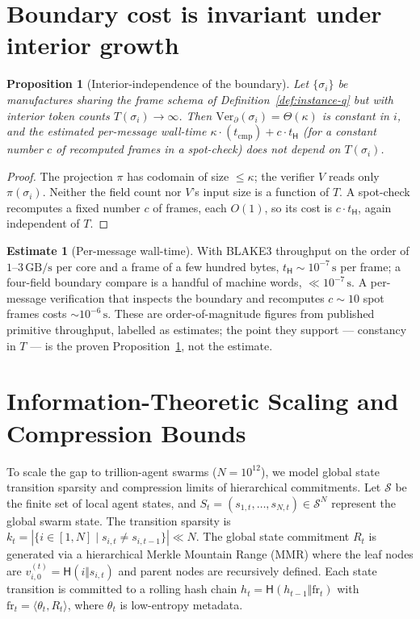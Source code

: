 \documentclass[11pt,oneside]{book}
\theoremstyle{definition}
\newtheorem{estimate}{Estimate}[chapter]
\theoremstyle{plain}
\newtheorem{proposition}[theorem]{Proposition}
\theoremstyle{remark}
\newcommand{\Proj}{\pi}                        %
\newcommand{\chainH}{\mathsf{H}}               %
\newcommand{\CL}{\kappa}                       %
\begin{document}
\section{Boundary cost is invariant under interior growth}

\begin{proposition}[Interior-independence of the boundary]\label{prop:invariance}
Let $\{\sigma_i\}$ be manufactures sharing the frame schema of Definition~\ref{def:instance-q} but with interior token counts $T(\sigma_i)\to\infty$. %
Then $\mathrm{Ver}_\partial(\sigma_i)=\Theta(\CL)$ is constant in $i$, and the estimated per-message wall-time $\CL\cdot(t_{\text{cmp}}) + c\cdot t_{\chainH}$ (for a constant number $c$ of recomputed frames in a spot-check) does not depend on $T(\sigma_i)$. %
\end{proposition}

\begin{proof}
The projection $\Proj$ has codomain of size $\le\CL$; the verifier $V$ reads only $\Proj(\sigma_i)$. %
Neither the field count nor $V$'s input size is a function of $T$. %
A spot-check recomputes a fixed number $c$ of frames, each $O(1)$, so its cost is $c\cdot t_{\chainH}$, again independent of $T$. %
\end{proof}

\begin{estimate}[Per-message wall-time]\label{est:wall}
With BLAKE3 throughput on the order of $1$--$3\,\mathrm{GB/s}$ per core and a frame of a few hundred bytes, $t_{\chainH}\sim 10^{-7}\,\mathrm{s}$ per frame; a four-field boundary compare is a handful of machine words, $\ll 10^{-7}\,\mathrm{s}$. %
A per-message verification that inspects the boundary and recomputes $c\!\sim\!10$ spot frames costs $\sim 10^{-6}\,\mathrm{s}$. %
These are order-of-magnitude figures from published primitive throughput, labelled as estimates; the point they support --- constancy in $T$ --- is the proven Proposition~\ref{prop:invariance}, not the estimate. %
\end{estimate}

\section{Information-Theoretic Scaling and Compression Bounds}
To scale the gap to trillion-agent swarms ($N = 10^{12}$), we model global state transition sparsity and compression limits of hierarchical commitments. %
Let $\mathcal{S}$ be the finite set of local agent states, and $S_t = (s_{1,t}, \dots, s_{N,t}) \in \mathcal{S}^N$ represent the global swarm state. %
The transition sparsity is $k_t = |\{i \in [1, N] \mid s_{i,t} \neq s_{i,t-1}\}| \ll N$. %
The global state commitment $R_t$ is generated via a hierarchical Merkle Mountain Range (MMR) \cite{todd2012} where the leaf nodes are $v_{i,0}^{(t)} = \chainH(i \Vert s_{i,t})$ and parent nodes are recursively defined. %
Each state transition is committed to a rolling hash chain $h_t = \chainH(h_{t-1} \Vert \mathrm{fr}_t)$ with $\mathrm{fr}_t = \langle \theta_t, R_t \rangle$, where $\theta_t$ is low-entropy metadata. %
\end{document}
